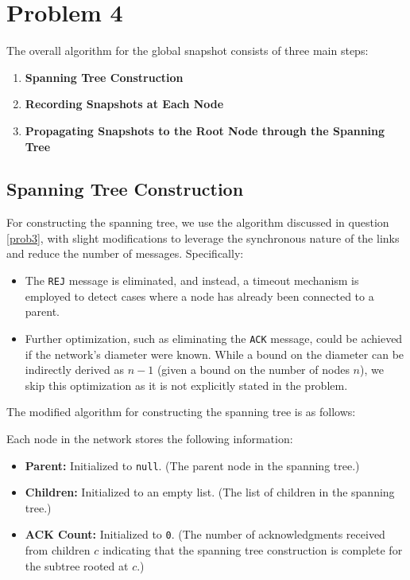 \section{Problem 4}\label{prob4}

The overall algorithm for the global snapshot consists of three main steps:
\begin{enumerate}
    \item \textbf{Spanning Tree Construction}
    \item \textbf{Recording Snapshots at Each Node}
    \item \textbf{Propagating Snapshots to the Root Node through the Spanning Tree}
\end{enumerate}

\subsection{Spanning Tree Construction}
For constructing the spanning tree, we use the algorithm discussed in question \ref{prob3}, with slight modifications to leverage the synchronous nature of the links and reduce the number of messages. Specifically:
\begin{itemize}
    \item The \texttt{REJ} message is eliminated, and instead, a timeout mechanism is employed to detect cases where a node has already been connected to a parent.
    \item Further optimization, such as eliminating the \texttt{ACK} message, could be achieved if the network's diameter were known. While a bound on the diameter can be indirectly derived as \(n-1\) (given a bound on the number of nodes \(n\)), we skip this optimization as it is not explicitly stated in the problem.
\end{itemize}

\noindent The modified algorithm for constructing the spanning tree is as follows:

Each node in the network stores the following information:
\begin{itemize}
    \item \textbf{Parent:} Initialized to \texttt{null}. (The parent node in the spanning tree.)
    \item \textbf{Children:} Initialized to an empty list. (The list of children in the spanning tree.)
    \item \textbf{ACK Count:} Initialized to \texttt{0}. (The number of acknowledgments received from children \(c\) indicating that the spanning tree construction is complete for the subtree rooted at \(c\).)
\end{itemize}

